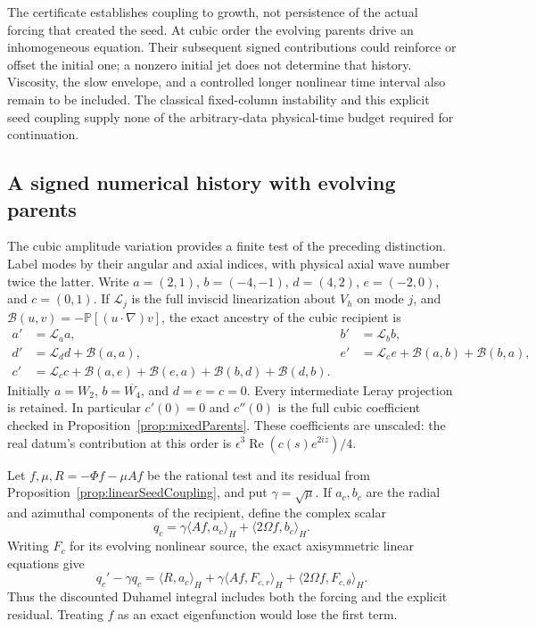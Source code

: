 \documentclass[11pt]{article}
\theoremstyle{remark}
\begin{document}
The certificate establishes coupling to growth, not persistence of the
actual forcing that created the seed. At cubic order the evolving parents
drive an inhomogeneous equation. Their subsequent signed contributions
could reinforce or offset the initial one; a nonzero initial jet does not
determine that history. Viscosity, the slow envelope, and a controlled
longer nonlinear time interval also remain to be included. The classical
fixed-column instability and this explicit seed coupling supply none of
the arbitrary-data physical-time budget required for continuation.

\subsection{A signed numerical history with evolving parents}

The cubic amplitude variation provides a finite test of the preceding
distinction. Label modes by their angular and axial indices, with physical
axial wave number twice the latter. Write
$a=(2,1)$, $b=(-4,-1)$, $d=(4,2)$, $e=(-2,0)$, and $c=(0,1)$.
If $\mathcal L_j$ is the full inviscid linearization about $V_h$ on
mode $j$, and $\mathcal B(u,v)=-\mathbb P[(u\cdot\nabla)v]$, the exact
ancestry of the cubic recipient is
\begin{align*}
 a'&=\mathcal L_a a,& b'&=\mathcal L_b b,\\
 d'&=\mathcal L_d d+\mathcal B(a,a),&
 e'&=\mathcal L_e e+\mathcal B(a,b)+\mathcal B(b,a),\\
 c'&=\mathcal L_c c+\mathcal B(a,e)+\mathcal B(e,a)
                         +\mathcal B(b,d)+\mathcal B(d,b).
\end{align*}
Initially $a=W_2$, $b=\overline{W_4}$, and $d=e=c=0$.
Every intermediate Leray projection is retained.
In particular $c'(0)=0$ and $c''(0)$ is the full cubic coefficient
checked in Proposition~\ref{prop:mixedParents}.
These coefficients are unscaled: the real datum's contribution at this
order is $\epsilon^3\operatorname{Re}(c(s)e^{2iz})/4$.

Let $f,\mu,R=-\Phi f-\mu Af$ be the rational test and its residual
from Proposition~\ref{prop:linearSeedCoupling}, and put
$\gamma=\sqrt\mu$. If $a_c,b_c$ are the radial and azimuthal components
of the recipient, define the complex scalar
\[
 q_c=\gamma\langle Af,a_c\rangle_H+\langle2\Omega f,b_c\rangle_H.
\]
Writing $F_c$ for its evolving nonlinear source, the exact axisymmetric
linear equations give
\[
 q_c'-\gamma q_c
  =\langle R,a_c\rangle_H+
       \gamma\langle Af,F_{c,r}\rangle_H+
                         \langle2\Omega f,F_{c,\theta}\rangle_H.
\]
Thus the discounted Duhamel integral includes both the forcing and the
explicit residual. Treating $f$ as an exact eigenfunction would lose
the first term.
\end{document}

